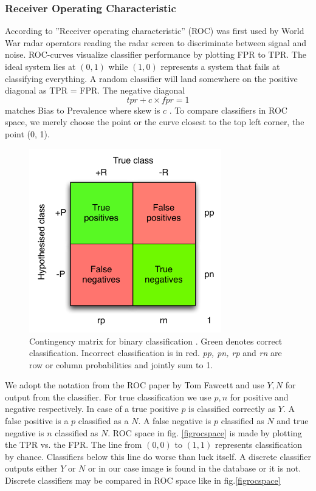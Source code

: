\documentclass[english,12pt,a4paper,pdftex,elec,utf8, table]{aaltothesis}
\begin{document}
\newcommand{\RNum}[1]{\uppercase\expandafter{\romannumeral #1\relax}}
\clearpage
\subsubsection{Receiver Operating Characteristic}\label{ROCSection}
According to \cite{Fan2006} ''Receiver operating characteristic'' (ROC) was first used by World War \RNum{2} radar operators reading the radar screen to discriminate between signal and noise. ROC-curves visualize classifier performance by plotting FPR to TPR. The ideal system lies at $(0, 1)$ while $(1, 0)$ represents a system that fails at classifying everything. A random classifier will land somewhere on the positive diagonal as TPR = FPR. The negative diagonal
\begin{equation}\label{biastoprevalence}
tpr + c\times fpr=1
\end{equation}
matches Bias to Prevalence where skew is $c$ \cite{POWERS2011}. To compare classifiers in ROC space, we merely choose the point or the curve closest to the top left corner, the point (0, 1).
\begin{figure}[htb]
\begin{center}
\includegraphics[height=8cm]{figures/confusion}
\end{center}
\caption{Contingency matrix for binary classification \cite{Fawcett2006}. Green denotes correct classification. Incorrect classification is in red. \emph{pp, pn, rp} and \emph{rn} are row or column probabilities and jointly sum to 1.}
\label{figconfusion}
\end{figure}

We adopt the notation from the ROC paper by Tom Fawcett and use ${Y,N}$ for output from the classifier. For true classification we use ${p,n}$ for positive and negative respectively. In case of a true positive $p$ is classified correctly as $Y$. A false positive is a $p$ classified as a $N$. A false negative is $p$ classified as $N$ and true negative is $n$ classified as $N$. ROC space in fig. \ref{figrocspace} is made by plotting the TPR vs. the FPR. The line from $(0,0)$ to $(1,1)$ represents classification by chance. Classifiers below this line do worse than luck itself. A discrete classifier outputs either $Y$ or $N$ or in our case image is found in the database or it is not. Discrete classifiers may be compared in ROC space like in fig.\ref{figrocspace} \cite{Fawcett2006}
\end{document}
